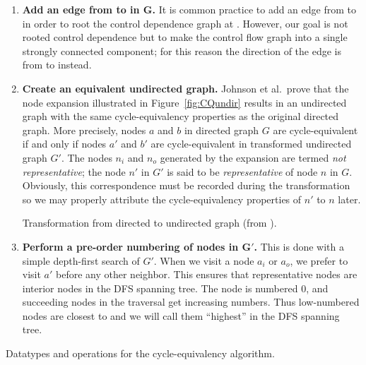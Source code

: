\documentclass[12pt,titlepage,twoside]{article}
\newcommand{\figscale}{1.0}
\begin{document}
\begin{enumerate}
\item \textbf{Add an edge from  to  in
$\mathbf{G}$.} It is common practice to add an edge from 
to  in order to root the control dependence graph at
 \cite{cytron89:ssa}.  However, our goal is not rooted
control dependence but to make the control flow graph into a single
strongly connected component; for this reason the direction of the
edge is from  to  instead.
\item \textbf{Create an equivalent undirected graph.}  Johnson et al.\
prove that the node expansion illustrated in Figure~\vref{fig:CQundir}
results in an undirected graph with the same cycle-equivalency
properties as the original directed graph.  More precisely, nodes $a$
and $b$ in directed graph $G$ are cycle-equivalent if and only if
nodes $a'$ and $b'$ are cycle-equivalent in transformed undirected
graph $G'$.  The nodes $n_i$ and $n_o$ generated by the expansion are
termed \emph{not representative}; the node $n'$ in $G'$ is said to be
\emph{representative} of node $n$ in $G$.  Obviously, this
correspondence must be recorded during the transformation so we may
properly attribute the cycle-equivalency properties of $n'$ to $n$
later.
\begin{myfigure}
\begin{center}
\renewcommand{\figscale}{0.5}
\end{center}
\caption{Transformation from directed to undirected graph
	 (from \cite{johnson93:sese}).}
\label{fig:CQundir}
\end{myfigure}
\item \textbf{Perform a pre-order numbering of nodes in $\mathbf{G'}$.}
This is done with a simple depth-first search of $G'$.  When we visit
a node $a_i$ or $a_o$, we prefer to visit $a'$ before any other
neighbor.  This ensures that representative nodes are interior nodes
in the DFS spanning tree. The \code{START} node is numbered 0, and succeeding
nodes in the traversal get increasing numbers.  Thus low-numbered
nodes are closest to \code{START} and we will call them ``highest'' in the
DFS spanning tree.
\end{enumerate}

\begin{myfigure}\small
\caption{Datatypes and operations for the cycle-equivalency algorithm.}
\label{fig:CQdata}\end{myfigure}
\end{document}
